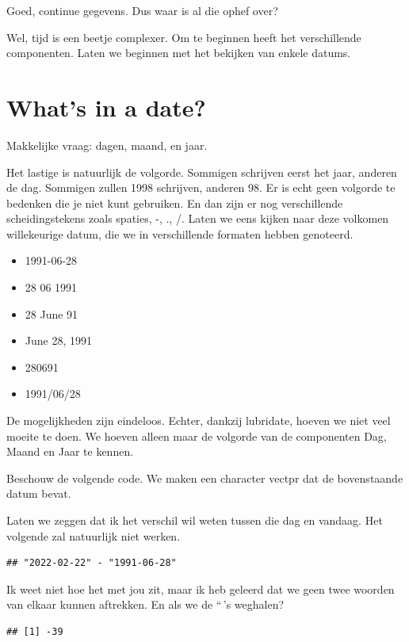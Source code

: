 \documentclass[]{tufte-book}
\providecommand{\tightlist}{%
  \setlength{\itemsep}{0pt}\setlength{\parskip}{0pt}}
\begin{document}
Goed, continue gegevens. Dus waar is al die ophef over?

Wel, tijd is een beetje complexer. Om te beginnen heeft het verschillende componenten. Laten we beginnen met het bekijken van enkele datums.

\hypertarget{whats-in-a-date}{%
\section{What's in a date?}\label{whats-in-a-date}}

Makkelijke vraag: dagen, maand, en jaar.

Het lastige is natuurlijk de volgorde. Sommigen schrijven eerst het jaar, anderen de dag. Sommigen zullen 1998 schrijven, anderen 98. Er is echt geen volgorde te bedenken die je niet kunt gebruiken. En dan zijn er nog verschillende scheidingstekens zoals spaties, -, ., /. Laten we eens kijken naar deze volkomen willekeurige datum, die we in verschillende formaten hebben genoteerd.

\begin{itemize}
\tightlist
\item
  1991-06-28
\item
  28 06 1991
\item
  28 June 91
\item
  June 28, 1991
\item
  280691
\item
  1991/06/28
\end{itemize}

De mogelijkheden zijn eindeloos. Echter, dankzij lubridate, hoeven we niet veel moeite te doen. We hoeven alleen maar de volgorde van de componenten Dag, Maand en Jaar te kennen.

Beschouw de volgende code. We maken een character vectpr dat de bovenstaande datum bevat.

Laten we zeggen dat ik het verschil wil weten tussen die dag en vandaag. Het volgende zal natuurlijk niet werken.

\begin{verbatim}
## "2022-02-22" - "1991-06-28"
\end{verbatim}

Ik weet niet hoe het met jou zit, maar ik heb geleerd dat we geen twee woorden van elkaar kunnen aftrekken. En als we de ``\,'s weghalen?

\begin{verbatim}
## [1] -39
\end{verbatim}
\end{document}
